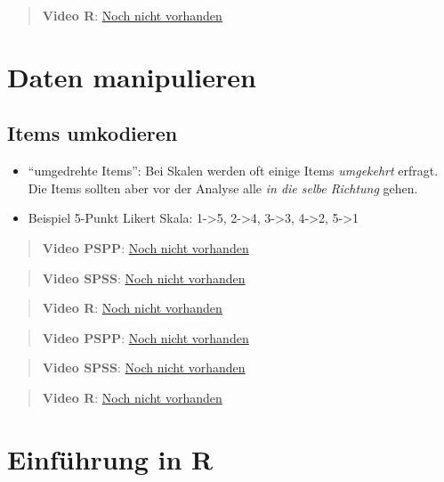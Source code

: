 \documentclass[
]{book}
\providecommand{\tightlist}{%
  \setlength{\itemsep}{0pt}\setlength{\parskip}{0pt}}
\begin{document}
\begin{quote}
\textbf{Video R}: \href{TBA}{Noch nicht vorhanden}
\end{quote}

\hypertarget{daten-manipulieren}{%
\chapter{Daten manipulieren}\label{daten-manipulieren}}

\hypertarget{items-umkodieren}{%
\section{Items umkodieren}\label{items-umkodieren}}

\begin{itemize}
\tightlist
\item
  ``umgedrehte Items'': Bei Skalen werden oft einige Items \emph{umgekehrt} erfragt. Die Items sollten aber vor der Analyse alle \emph{in die selbe Richtung} gehen.
\item
  Beispiel 5-Punkt Likert Skala: 1-\textgreater5, 2-\textgreater4, 3-\textgreater3, 4-\textgreater2, 5-\textgreater1
\end{itemize}

\begin{quote}
\textbf{Video PSPP}: \href{TBA}{Noch nicht vorhanden}
\end{quote}

\begin{quote}
\textbf{Video SPSS}: \href{TBA}{Noch nicht vorhanden}
\end{quote}

\begin{quote}
\textbf{Video R}: \href{TBA}{Noch nicht vorhanden}
\end{quote}

\begin{quote}
\textbf{Video PSPP}: \href{TBA}{Noch nicht vorhanden}
\end{quote}

\begin{quote}
\textbf{Video SPSS}: \href{TBA}{Noch nicht vorhanden}
\end{quote}

\begin{quote}
\textbf{Video R}: \href{TBA}{Noch nicht vorhanden}
\end{quote}

\hypertarget{einfuxfchrung-in-r}{%
\chapter{Einführung in R}\label{einfuxfchrung-in-r}}
\end{document}
